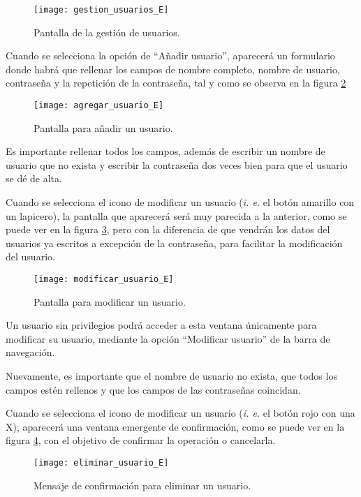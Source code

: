 \begin{figure}[ht]
	\texttt{[image: gestion\_usuarios\_E]}
	\caption{Pantalla de la gestión de usuarios.}
	\label{fig:gestion_usuarios_E}
\end{figure}

Cuando se selecciona la opción de ``Añadir usuario'', aparecerá un formulario donde habrá que rellenar los campos de nombre completo, nombre de usuario, contraseña y la repetición de la contraseña, tal y como se observa en la figura \ref{fig:agregar_usuario_E}

\begin{figure}[ht]
	\texttt{[image: agregar\_usuario\_E]}
	\caption{Pantalla para añadir un usuario.}
	\label{fig:agregar_usuario_E}
\end{figure}

Es importante rellenar todos los campos, además de escribir un nombre de usuario que no exista y escribir la contraseña dos veces bien para que el usuario se dé de alta.

Cuando se selecciona el icono de modificar un usuario (\textit{i. e.} el botón amarillo con un lapicero), la pantalla que aparecerá será muy parecida a la anterior, como se puede ver en la figura \ref{fig:modificar_usuario_E}, pero con la diferencia de que vendrán los datos del usuarios ya escritos a excepción de la contraseña, para facilitar la modificación del usuario.

\begin{figure}[ht]
	\texttt{[image: modificar\_usuario\_E]}
	\caption{Pantalla para modificar un usuario.}
	\label{fig:modificar_usuario_E}
\end{figure}

Un usuario sin privilegios podrá acceder a esta ventana únicamente para modificar su usuario, mediante la opción ``Modificar usuario'' de la barra de navegación.

Nuevamente, es importante que el nombre de usuario no exista, que todos los campos estén rellenos y que los campos de las contraseñas coincidan.

Cuando se selecciona el icono de modificar un usuario (\textit{i. e.} el botón rojo con una X), aparecerá una ventana emergente de confirmación, como se puede ver en la figura \ref{fig:eliminar_usuario_E}, con el objetivo de confirmar la operación o cancelarla.

\begin{figure}[ht]
	\texttt{[image: eliminar\_usuario\_E]}
	\caption{Mensaje de confirmación para eliminar un usuario.}
	\label{fig:eliminar_usuario_E}
\end{figure}

